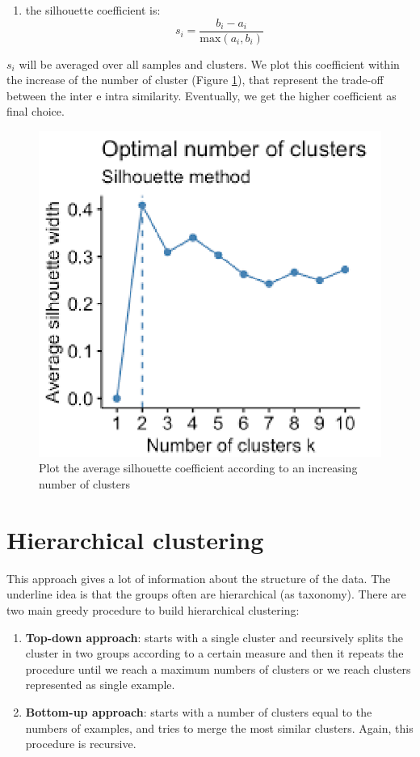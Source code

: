 \begin{itemize}
\begin{enumerate}
			\item the silhouette coefficient is:
				\[
					s_{i}= \frac{b_{i}- a_{i}}{\text{max}(a_{i}, b_{i})}
				\]
		\end{enumerate}
		$s_{i}$ will be averaged over all samples and clusters. We plot this coefficient
		within the increase of the number of cluster (Figure \ref{fig:silhouette}),
		that represent the trade-off between the inter e intra similarity. Eventually,
		we get the higher coefficient as final choice.
		\begin{figure}[H]
			\centering
			\includegraphics[scale=0.3]{
				images/18_UnsupervisedLearning_silhouetteMethod.png
			}
			\caption{Plot the average silhouette coefficient according to an
			increasing number of clusters}
			\label{fig:silhouette}
		\end{figure}
\end{itemize}

\section{Hierarchical clustering}
This approach gives a lot of information about the structure of the data. The
underline idea is that the groups often are hierarchical (as taxonomy). There are
two main greedy procedure to build hierarchical clustering:
\begin{enumerate}
	\item \textbf{Top-down approach}: starts with a single cluster and recursively
		splits the cluster in two groups according to a certain measure and then it repeats
		the procedure until we reach a maximum numbers of clusters or we reach clusters
		represented as single example.

	\item \textbf{Bottom-up approach}: starts with a number of clusters equal to the
		numbers of examples, and tries to merge the most similar clusters. Again,
		this procedure is recursive.
\end{enumerate}

